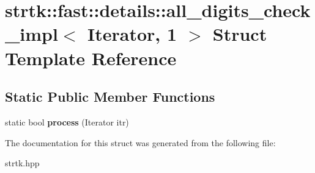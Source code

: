 \hypertarget{structstrtk_1_1fast_1_1details_1_1all__digits__check__impl_3_01Iterator_00_011_01_4}{\section{strtk\-:\-:fast\-:\-:details\-:\-:all\-\_\-digits\-\_\-check\-\_\-impl$<$ Iterator, 1 $>$ Struct Template Reference}
\label{structstrtk_1_1fast_1_1details_1_1all__digits__check__impl_3_01Iterator_00_011_01_4}
}
\subsection*{Static Public Member Functions}
\begin{DoxyCompactItemize}
\item 
\hypertarget{structstrtk_1_1fast_1_1details_1_1all__digits__check__impl_3_01Iterator_00_011_01_4_aade4bb61cad474158bee8b465856b29a}{static bool {\bfseries process} (Iterator itr)}\label{structstrtk_1_1fast_1_1details_1_1all__digits__check__impl_3_01Iterator_00_011_01_4_aade4bb61cad474158bee8b465856b29a}

\end{DoxyCompactItemize}


The documentation for this struct was generated from the following file\-:\begin{DoxyCompactItemize}
\item 
strtk.\-hpp\end{DoxyCompactItemize}
